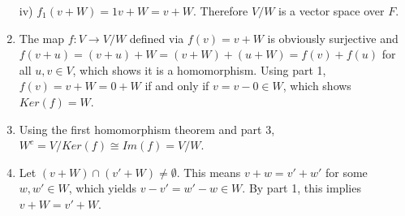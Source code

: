 \begin{solution}
\begin{enumerate}
iv) $f_1(v+W)=1v+W=v+W$.
\vskip2mm
Therefore $V/W$ is a vector space over $F$.
\vskip2mm
\item The map $f:V \rightarrow V/W$ defined via $f(v)=v+W$ is obviously surjective and 
$f(v+u)=(v+u)+W=(v+W)+(u+W)=f(v)+f(u)$ for all $u,v \in V$, which shows it is a homomorphism. 
Using part 1, $f(v)=v+W=0+W$ if and only if $v=v-0 \in W$, which shows $Ker(f)=W$.
\vskip2mm
\item Using the first homomorphism theorem and part 3, $W^c=V/Ker(f) \cong Im(f)=V/W$.
\vskip2mm
\item Let $(v+W)\cap (v'+W) \neq \emptyset$. This means $v+w=v'+w'$ for some $w,w' \in W$, which yields 
$v-v'=w'-w \in W$. By part 1, this implies $v+W=v'+W$.
\end{enumerate}
\end{solution}

\probskip

